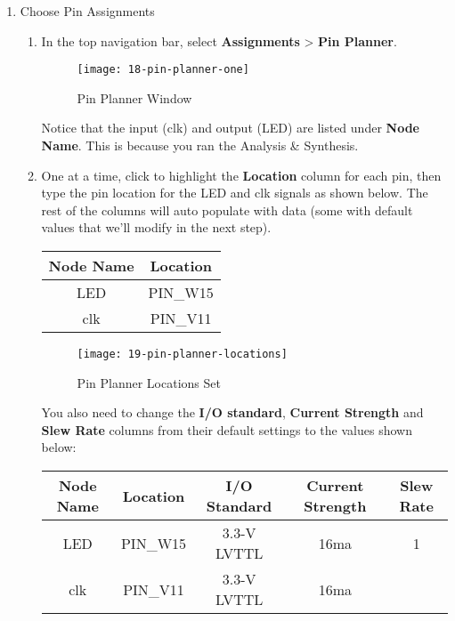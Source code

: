 \begin{flushleft}
\begin{enumerate}[
	label=\textbf{Step \arabic*.},
	leftmargin=*,
	widest={00},
	align=left]
\item Choose Pin Assignments

\begin{enumerate}[
	label=\textbf{Step \arabic{enumi}\alph*.},
	leftmargin=*,
	align=left]

\item In the top navigation bar, select \textbf{Assignments} > \textbf{Pin Planner}.

\begin{figure}[H]
\centering
\texttt{[image: 18-pin-planner-one]}
\caption{Pin Planner Window}
\label{fig:18-pin-planner-one}
\end{figure}

Notice that the input (clk) and output (LED) are listed under \textbf{Node Name}. This is because you ran the Analysis \& Synthesis.

\item One at a time, click to highlight the \textbf{Location} column for each pin, then type the pin location for the LED and clk signals as shown below. The rest of the columns will auto populate with data (some with default values that we'll modify in the next step).

\begin{center}
\begin{tabular}{ |c|c| }
\hline
Node Name & Location \\
\hline
LED & PIN\_W15 \\
clk & PIN\_V11 \\
\hline
\end{tabular}
\end{center}

\begin{figure}[H]
\centering
\texttt{[image: 19-pin-planner-locations]}
\caption{Pin Planner Locations Set}
\label{fig:19-pin-planner-locations}
\end{figure}

You also need to change the \textbf{I/O standard}, \textbf{Current Strength} and \textbf{Slew Rate} columns from their default settings to the values shown below:

\begin{center}
\begin{tabular}{ |c|c|c|c|c| }
\hline
Node Name & Location & I/O Standard & Current Strength & Slew Rate\\
\hline
LED & PIN\_W15 & 3.3-V LVTTL & 16ma & 1 \\
clk & PIN\_V11 & 3.3-V LVTTL & 16ma &  \\
\hline
\end{tabular}
\end{center}


\end{enumerate}
\end{enumerate}
\end{flushleft}
